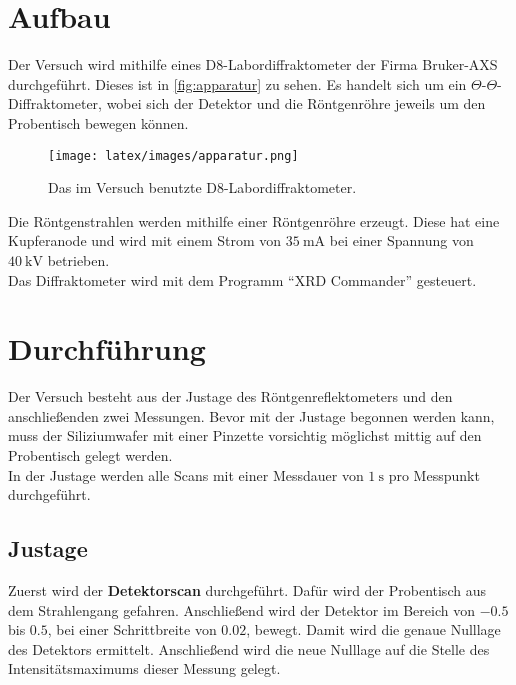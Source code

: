 \section{Aufbau}

    \noindent Der Versuch wird mithilfe eines D8-Labordiffraktometer der Firma Bruker-AXS durchgeführt. Dieses ist in \autoref{fig:apparatur}
    zu sehen. Es handelt sich um ein $\Theta$-$\Theta$-Diffraktometer, wobei sich der Detektor und die Röntgenröhre jeweils um den 
    Probentisch bewegen können. 
    \begin{figure}
        \centering
        \texttt{[image: latex/images/apparatur.png]}
        \caption{Das im Versuch benutzte D8-Labordiffraktometer. }
        \label{fig:apparatur}
    \end{figure}
    Die Röntgenstrahlen werden mithilfe einer Röntgenröhre erzeugt. Diese hat eine Kupferanode und wird mit einem Strom von $\SI{35}{\milli\ampere}$ 
    bei einer Spannung von $\SI{40}{\kilo\volt}$ betrieben. \\
    Das Diffraktometer wird mit dem Programm \enquote{XRD Commander} gesteuert. 

\section{Durchführung}

    \noindent 
    Der Versuch besteht aus der  Justage des Röntgenreflektometers und den anschließenden zwei Messungen.
    Bevor mit der Justage begonnen werden kann, muss der Siliziumwafer mit einer Pinzette vorsichtig möglichst mittig auf den Probentisch gelegt werden. \\
    In der Justage werden alle Scans mit einer Messdauer von $\SI{1}{\second}$ pro Messpunkt durchgeführt.


    \subsection{Justage}

        \noindent Zuerst wird der \textbf{Detektorscan} durchgeführt. Dafür wird der Probentisch aus dem Strahlengang gefahren. Anschließend 
        wird der Detektor im Bereich von $\num{-0.5}$ bis $\num{0.5}$, bei einer Schrittbreite von $\num{0.02} $, bewegt. 
        Damit wird die genaue Nulllage des Detektors ermittelt. Anschließend wird die neue Nulllage auf die Stelle des Intensitätsmaximums 
        dieser Messung gelegt. \\

